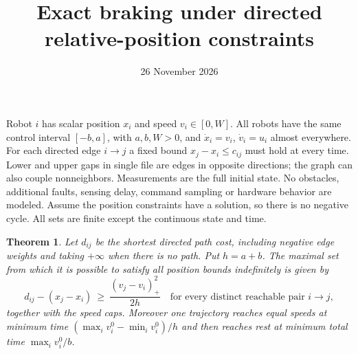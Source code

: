 \documentclass[11pt]{article}
\title{Exact braking under directed relative-position constraints}
\author{}
\date{26 November 2026}
\newtheorem{theorem}{Theorem}
\begin{document}
\maketitle

Robot $i$ has scalar position $x_i$ and speed $v_i\in[0,W]$. All robots have the same control interval $[-b,a]$, with $a,b,W>0$, and $\dot x_i=v_i$, $\dot v_i=u_i$ almost everywhere. For each directed edge $i\to j$ a fixed bound $x_j-x_i\le c_{ij}$ must hold at every time. Lower and upper gaps in single file are edges in opposite directions; the graph can also couple nonneighbors. Measurements are the full initial state. No obstacles, additional faults, sensing delay, command sampling or hardware behavior are modeled. Assume the position constraints have a solution, so there is no negative cycle. All sets are finite except the continuous state and time.

\begin{theorem}
Let $d_{ij}$ be the shortest directed path cost, including negative edge weights and taking $+\infty$ when there is no path. Put $h=a+b$. The maximal set from which it is possible to satisfy all position bounds indefinitely is given by
\[
 d_{ij}-(x_j-x_i) \ \ge\ \frac{(v_j-v_i)_+^2}{2h}
 \quad\text{for every distinct reachable pair }i\to j,
\]
together with the speed caps. Moreover one trajectory reaches equal speeds at minimum time $(\max_i v_i^0-\min_i v_i^0)/h$ and then reaches rest at minimum total time $\max_i v_i^0/b$.
\end{theorem}
\end{document}

